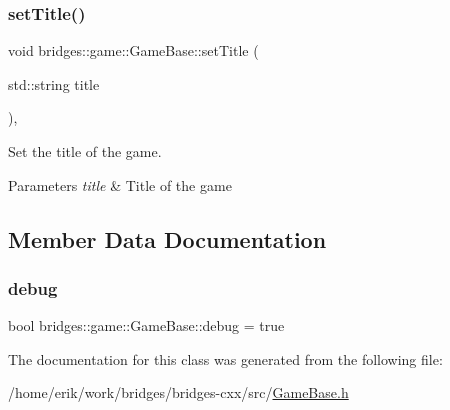\subsubsection{\texorpdfstring{set\+Title()}{setTitle()}}
{\footnotesize\ttfamily void bridges\+::game\+::\+Game\+Base\+::set\+Title (\begin{DoxyParamCaption}\item[{std\+::string}]{title }\end{DoxyParamCaption})\hspace{0.3cm}{\ttfamily [inline]}, {\ttfamily [protected]}}



Set the title of the game. 


\begin{DoxyParams}{Parameters}
{\em title} & Title of the game \\
\hline
\end{DoxyParams}


\subsection{Member Data Documentation}
\mbox{\label{classbridges_1_1game_1_1_game_base_ad2af01edd927a31613d3b881286541bb}} 
\subsubsection{\texorpdfstring{debug}{debug}}
{\footnotesize\ttfamily bool bridges\+::game\+::\+Game\+Base\+::debug = true\hspace{0.3cm}{\ttfamily [protected]}}



The documentation for this class was generated from the following file\+:\begin{DoxyCompactItemize}
\item 
/home/erik/work/bridges/bridges-\/cxx/src/\hyperlink{_game_base_8h}{Game\+Base.\+h}\end{DoxyCompactItemize}
